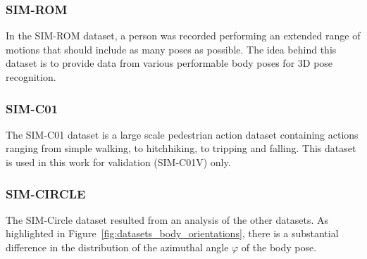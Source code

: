 \documentclass[a4paper, 10pt, conference]{ieeeconf}
\begin{document}
\subsubsection{SIM-ROM}
In the SIM-ROM dataset, a person was recorded performing an extended range of motions that should include as many poses as possible. The idea behind this dataset is to provide data from various performable body poses for 3D pose recognition.

\subsubsection{SIM-C01}
The SIM-C01 dataset is a large scale pedestrian action dataset containing actions ranging from simple walking, to hitchhiking, to tripping and falling. This dataset is used in this work for validation (SIM-C01V) only.

\subsubsection{SIM-CIRCLE}
The SIM-Circle dataset resulted from an analysis of the other datasets. As highlighted in Figure~\ref{fig:datasets_body_orientations}, there is a substantial difference in the distribution of the azimuthal angle $\varphi$ of the body pose.
\end{document}
